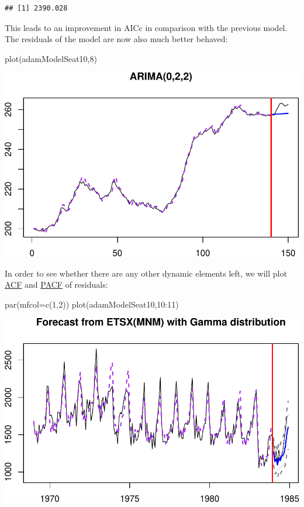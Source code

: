 \documentclass[
]{book}
\newenvironment{Shaded}{\begin{snugshade}}{\end{snugshade}}
\newcommand{\AttributeTok}[1]{\textcolor[rgb]{0.77,0.63,0.00}{#1}}
\newcommand{\DecValTok}[1]{\textcolor[rgb]{0.00,0.00,0.81}{#1}}
\newcommand{\FunctionTok}[1]{\textcolor[rgb]{0.00,0.00,0.00}{#1}}
\newcommand{\NormalTok}[1]{#1}
\newcommand{\SpecialCharTok}[1]{\textcolor[rgb]{0.00,0.00,0.00}{#1}}
\theoremstyle{definition}
\theoremstyle{definition}
\theoremstyle{definition}
\theoremstyle{definition}
\theoremstyle{remark}
\begin{document}
\begin{verbatim}
## [1] 2390.028
\end{verbatim}

This leads to an improvement in AICc in comparison with the previous model. The residuals of the model are now also much better behaved:

\begin{Shaded}
\begin{Highlighting}[]
\FunctionTok{plot}\NormalTok{(adamModelSeat10,}\DecValTok{8}\NormalTok{)}
\end{Highlighting}
\end{Shaded}

\includegraphics{adam_files/figure-latex/unnamed-chunk-148-1.pdf}

In order to see whether there are any other dynamic elements left, we will plot \protect\hyperlink{ACF}{ACF} and \protect\hyperlink{PACF}{PACF} of residuals:

\begin{Shaded}
\begin{Highlighting}[]
\FunctionTok{par}\NormalTok{(}\AttributeTok{mfcol=}\FunctionTok{c}\NormalTok{(}\DecValTok{1}\NormalTok{,}\DecValTok{2}\NormalTok{))}
\FunctionTok{plot}\NormalTok{(adamModelSeat10,}\DecValTok{10}\SpecialCharTok{:}\DecValTok{11}\NormalTok{)}
\end{Highlighting}
\end{Shaded}

\includegraphics{adam_files/figure-latex/unnamed-chunk-149-1.pdf}
\end{document}

